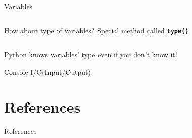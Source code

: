 		\begin{frame}{Variables}
			\inputminted[frame=single,framesep=2pt]{python3}{code-examples/variables.py}
		\end{frame}
		
		\begin{frame}{How about type of variables?}
			\LARGE
			Special method called \texttt{\textbf{type()}} 
			\inputminted[frame=single,framesep=2pt]{python3}{code-examples/types.py}
			Python knows variables' type even if you don't know it!
		\end{frame}

		\begin{frame}{Console I/O(Input/Output)}
			
		\end{frame}



\section{References}
	\begin{frame}{References}
		
		
	\end{frame}

